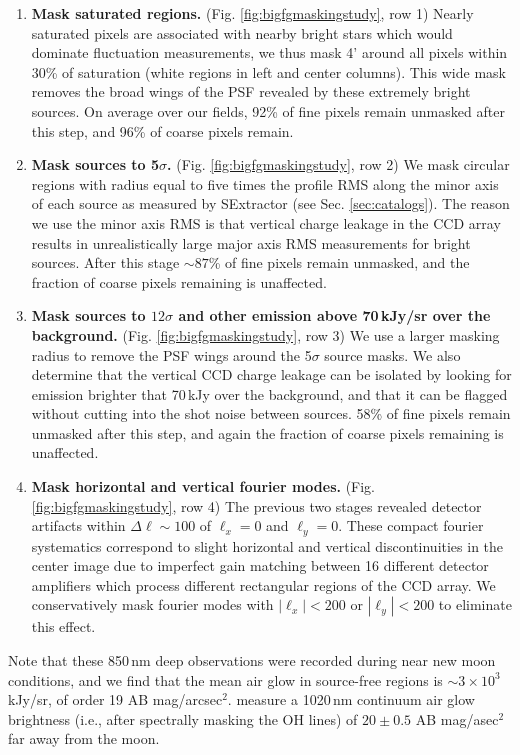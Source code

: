 \documentclass{emulateapj}
\begin{document}
\begin{enumerate}
	\item \textbf{Mask saturated regions.} (Fig. \ref{fig:bigfgmaskingstudy}, row 1) Nearly saturated pixels are associated with nearby bright stars which would dominate fluctuation measurements, we thus mask 4' around all pixels within 30\% of saturation (white regions in left and center columns). This wide mask removes the broad wings of the PSF revealed by these extremely bright sources. On average over our fields, 92\% of fine pixels remain unmasked after this step, and 96\% of coarse pixels remain.
	\item \textbf{Mask sources to 5$\sigma$.} (Fig. \ref{fig:bigfgmaskingstudy}, row 2) We mask circular regions with radius equal to five times the profile RMS along the minor axis of each source as measured by SExtractor (see Sec. \ref{sec:catalogs}). The reason we use the minor axis RMS is that vertical charge leakage in the CCD array results in unrealistically large major axis RMS measurements for bright sources. After this stage $\sim87$\% of fine pixels remain unmasked, and the fraction of coarse pixels remaining is unaffected.
	\item \textbf{Mask sources to $12\sigma$ and other emission above 70\,kJy/sr over the background.} (Fig. \ref{fig:bigfgmaskingstudy}, row 3) We use a larger masking radius to remove the PSF wings around the 5$\sigma$ source masks. We also determine that the vertical CCD charge leakage can be isolated by looking for emission brighter that 70\,kJy over the background, and that it can be flagged without cutting into the shot noise between sources. 58\% of fine pixels remain unmasked after this step, and again the fraction of coarse pixels remaining is unaffected.
	\item \textbf{Mask horizontal and vertical fourier modes.} (Fig. \ref{fig:bigfgmaskingstudy}, row 4) The previous two stages revealed detector artifacts within $\Delta\ell \sim100$ of $\ell_x=0$ and $\ell_y=0$. These compact fourier systematics correspond to slight horizontal and vertical discontinuities in the center image due to imperfect gain matching between 16 different detector amplifiers which process different rectangular regions of the CCD array. We conservatively mask fourier modes with $|\ell_x|<200$ or $|\ell_y|<200$ to eliminate this effect.
\end{enumerate}

Note that these 850\,nm deep observations were recorded during near new moon conditions, and we find that the mean air glow in source-free regions is $\sim3\times10^3$ kJy/sr, of order 19 AB mag/arcsec$^2$. \citet{sullivan12} measure a 1020\,nm continuum air glow brightness (i.e., after spectrally masking the OH lines) of $20\pm0.5$ AB mag/asec$^2$ far away from the moon. 
\end{document}
